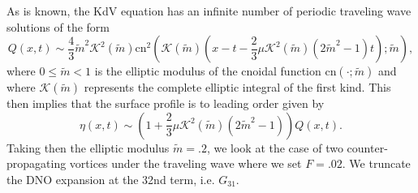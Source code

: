 \documentclass[a4paper,11pt]{article}
\begin{document}
As is known, the KdV equation has an infinite number of periodic traveling wave solutions of the form 
\[
Q(x,t) \sim \frac{4}{3} \tilde{m}^{2}\mathcal{K}^2(\tilde{m})\mbox{cn}^{2}\left(\mathcal{K}(\tilde{m}) \left( x- t - \frac{2}{3}\mu\mathcal{K}^{2}(\tilde{m}) (2\tilde{m}^{2}-1)t\right);\tilde{m}\right),
\]
where $0\leq \tilde{m}<1$ is the elliptic modulus of the cnoidal function $\mbox{cn}(\cdot;\tilde{m})$ and where $\mathcal{K}(\tilde{m})$ represents the complete elliptic integral of the first kind.  This then implies that the surface profile is to leading order given by 
\[
\eta(x,t) \sim \left(1+\frac{2}{3}\mu \mathcal{K}^{2}(\tilde{m})(2\tilde{m}^{2}-1)\right)Q(x,t).
\]
Taking then the elliptic modulus $\tilde{m}=.2$, we look at the case of two counter-propagating vortices under the traveling wave where we set $F=.02$.  We truncate the DNO expansion at the 32nd term, i.e. $G_{31}$.    
\end{document}
